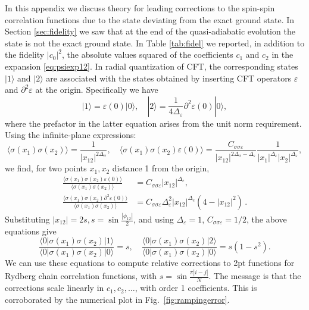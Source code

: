 \documentclass[a4paper,12pt]{article}
\theoremstyle{remark}
\theoremstyle{theorem}
\begin{document}
In this appendix we discuss theory for leading corrections to the spin-spin
correlation functions due to the state deviating from the exact ground state.
In Section \ref{sec:fidelity} we saw that at the end of the quasi-adiabatic evolution the
state is not the exact ground state. In Table \ref{tab:fidel} we reported, in addition
to the fidelity $| c_0 |^2$, the absolute values squared of the coefficients
$c_1$ and $c_2$ in the expansion \eqref{eq:psiexp12}. In radial quantization of CFT, the
corresponding states $| 1 \rangle $ and $| 2 \rangle $ are associated with
the states obtained by inserting CFT operators $\varepsilon$ and $\partial^2
\varepsilon$ at the origin. Specifically we have
\begin{equation}
	| 1 \rangle  = \varepsilon (0) | 0 \rangle , \quad | 2 \rangle  = \frac{1}{4
		\Delta_{\varepsilon}} \partial^2 \varepsilon (0) | 0 \rangle ,
\end{equation}
where the prefactor in the latter equation arises from the unit
norm requirement. Using the infinite-plane expressions:
\begin{equation}
	\langle \sigma (x_1) \sigma (x_2) \rangle = \frac{1}{| x_{12} |^{2
			\Delta_{\sigma}}}, \quad \langle \sigma (x_1) \sigma (x_2) \varepsilon (0)
	\rangle = \frac{C_{\sigma \sigma \varepsilon}}{| x_{12} |^{2 \Delta_{\sigma}
			- \Delta_{\varepsilon}}} \frac{1}{| x_1 |^{\Delta_{\varepsilon}} | x_2
		|^{\Delta_{\varepsilon}}},
\end{equation}
we find, for two points $x_1, x_2$ distance 1 from the origin,
\begin{align}
	\frac{\langle \sigma (x_1) \sigma (x_2) \varepsilon (0) \rangle}{\langle
		\sigma (x_1) \sigma (x_2) \rangle} &= C_{\sigma \sigma \varepsilon} | x_{12}
	|^{\Delta_e}, \\
	\frac{\langle \sigma (x_1) \sigma (x_2) \partial^2 \varepsilon (0)
		\rangle}{\langle \sigma (x_1) \sigma (x_2) \rangle} &= C_{\sigma \sigma
		\varepsilon} \Delta_{\varepsilon}^2 | x_{12} |^{\Delta_e} (4 - | x_{12} |^2)\,.
\end{align}
Substituting $| x_{12} | = 2 s, s = \sin \frac{| \phi_{12} |}{2}$, and
using $\Delta_{\varepsilon} = 1$, $C_{\sigma \sigma \varepsilon} = 1 / 2$, the
above equations give
\begin{equation}
	\frac{\langle 0 |  \sigma (x_1) \sigma (x_2) |  1 \rangle}{\langle 0 | 
		\sigma (x_1) \sigma (x_2) |  0 \rangle} = s, \quad \frac{\langle 0 |  \sigma
		(x_1) \sigma (x_2) |  2 \rangle}{\langle 0 |  \sigma (x_1) \sigma (x_2) |  0
		\rangle} = s (1 - s^2) .
\end{equation}
We can use these equations to compute relative corrections to 2pt functions for Rydberg
chain correlation functions, with $s = \sin \frac{\pi | i - j |}{N}$. The
message is that the corrections scale linearly in $c_1, c_2,
\ldots$, with order 1 coefficients. This is corroborated by the numerical
plot in Fig.~\ref{fig:rampingerror}.
	

\small
\setlength{\bibsep}{2pt}

\end{document}
